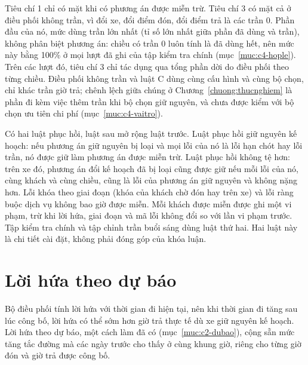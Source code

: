Tiêu chí 1 chỉ có mặt khi có phương án được miễn trừ. Tiêu chí 3 có mặt cả ở điều phối không trần, vì đổi xe,
đổi điểm đón, đổi điểm trả là các trần 0. Phần đầu của nó, mức dùng trần lớn nhất (tỉ số lớn nhất giữa phần đã
dùng và trần), không phân biệt phương án: chiều có trần 0 luôn tính là đã dùng hết, nên mức này bằng 100\% ở mọi
lượt đã ghi của tập kiểm tra chính (mục~\ref{muc:c4-hople}). Trên các lượt đó, tiêu chí 3 chỉ tác dụng qua tổng
phần dời do điều phối theo từng chiều. Điều phối không trần và luật C dùng cùng cấu hình và cùng bộ chọn, chỉ
khác trần giờ trả; chênh lệch giữa chúng ở Chương~\ref{chuong:thucnghiem} là phần đi kèm việc thêm trần khi bộ
chọn giữ nguyên, và chưa được kiểm với bộ chọn ưu tiên chi phí (mục~\ref{muc:c4-vaitro}).

Có hai luật phục hồi, luật sau mở rộng luật trước. Luật phục hồi giữ nguyên kế hoạch: nếu phương án giữ nguyên
bị loại và mọi lỗi của nó là lỗi hạn chót hay lỗi trần, nó được giữ làm phương án được miễn trừ. Luật phục hồi
không tệ hơn: trên xe đó, phương án đổi kế hoạch đã bị loại cũng được giữ nếu mỗi lỗi của nó, cùng khách và
cùng chiều, cũng là lỗi của phương án giữ nguyên và không nặng hơn. Lỗi khóa theo giai đoạn (khóa của khách chờ
đón hay trên xe) và lỗi ràng buộc dịch vụ không bao giờ được miễn. Mỗi khách được miễn được ghi một vi phạm, trừ
khi lời hứa, giai đoạn và mã lỗi không đổi so với lần vi phạm trước. Tập kiểm tra chính và tập chỉnh trần buổi
sáng dùng luật thứ hai. Hai luật này là chi tiết cài đặt, không phải đóng góp của khóa luận.

\section{Lời hứa theo dự báo}
\label{muc:dubao}

Bộ điều phối tính lời hứa với thời gian đi hiện tại, nên khi thời gian đi tăng sau lúc công bố, lời hứa có thể
sớm hơn giờ trả thực tế dù xe giữ nguyên kế hoạch. Lời hứa theo dự báo, một cách làm đã có
(mục~\ref{muc:c2-dubao}), cộng sẵn mức tăng tắc đường mà các ngày trước cho thấy ở cùng khung giờ, riêng cho
từng giờ đón và giờ trả được công bố.

